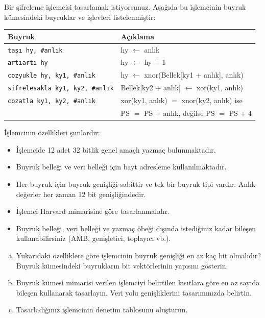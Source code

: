 \begin{alistirma}[\zor]
Bir şifreleme işlemcisi tasarlamak istiyorsunuz. Aşağıda bu işlemcinin buyruk kümesindeki buyruklar ve işlevleri listelenmiştir:

\begin{center}
\begin{tabular}{ll}
\toprule
\textbf{Buyruk} & \textbf{Açıklama} \\
\midrule
\texttt{taşı hy, \#anlık} & hy $\leftarrow$ anlık \\
\texttt{artıartı hy} & hy $\leftarrow$ hy + 1 \\
\texttt{cozyukle hy, ky1, \#anlık} & hy $\leftarrow$ xnor(Bellek[ky1 + anlık], anlık) \\
\texttt{sifrelesakla ky1, ky2, \#anlık} & Bellek[ky2 + anlık] $\leftarrow$ xor(ky1, anlık) \\
\texttt{cozatla ky1, ky2, \#anlık} & xor(ky1, anlık) $=$ xnor(ky2, anlık) ise \\
 & \quad PS $=$ PS + anlık, değilse PS $=$ PS + 4 \\
\bottomrule
\end{tabular}
\end{center}

İşlemcinin özellikleri şunlardır:
\begin{itemize}
    \item İşlemcide 12 adet 32 bitlik genel amaçlı yazmaç bulunmaktadır.
    \item Buyruk belleği ve veri belleği için bayt adresleme kullanılmaktadır.
    \item Her buyruk için buyruk genişliği sabittir ve tek bir buyruk tipi vardır. Anlık değerler her zaman 12 bit genişliğindedir.
    \item İşlemci Harvard mimarisine göre tasarlanmalıdır.
    \item Buyruk belleği, veri belleği ve yazmaç öbeği dışında istediğiniz kadar bileşen kullanabilirsiniz (AMB, genişletici, toplayıcı vb.).
\end{itemize}

\begin{enumerate}[(a)]
    \item Yukarıdaki özelliklere göre işlemcinin buyruk genişliği en az kaç bit olmalıdır? Buyruk kümesindeki buyrukların bit vektörlerinin yapısını gösterin.
    \item Buyruk kümesi mimarisi verilen işlemciyi belirtilen kısıtlara göre en az sayıda bileşen kullanarak tasarlayın. Veri yolu genişliklerini tasarımınızda belirtin.
    \item Tasarladığınız işlemcinin denetim tablosunu oluşturun.
\end{enumerate}
\end{alistirma}

